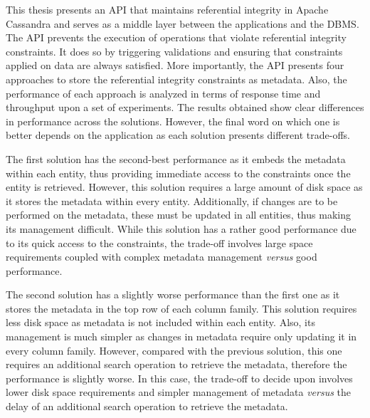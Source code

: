 This thesis presents an \ac{API} that maintains referential integrity in Apache
Cassandra and serves as a middle layer between the applications and the
\ac{DBMS}. The \ac{API} prevents the execution of operations that violate
referential integrity constraints. It does so by triggering validations and
ensuring that constraints applied on data are always satisfied.
More importantly, the \ac{API} presents four approaches to store the referential
integrity constraints as metadata. Also, the performance of each approach is
analyzed in terms of response time and throughput upon a set of experiments. The
results obtained show  clear differences in  performance across the solutions.
However, the final word on which one is better depends on the application as
each solution presents different trade-offs.


The first solution has the second-best performance as it embeds the metadata
within each entity, thus providing immediate access to the constraints once the
entity is retrieved. However, this solution requires a large amount of disk
space as it stores the metadata within every entity. Additionally, if changes
are to be performed on the metadata, these must be updated in all entities, thus
making its management difficult.
While this solution has a rather good performance due to its quick access to the
constraints, the trade-off  involves large space requirements
coupled with complex metadata management \textit{versus} good performance.


The second solution has a slightly worse performance than the first one as it
stores the metadata in the top row of each column family. This solution requires
less disk space as metadata is not included within each entity. Also,
its management is much simpler as changes in metadata  require only updating it
in every column family. However, compared with the previous solution,  this
one requires an additional search operation to retrieve the metadata, therefore  
the performance is slightly worse. In this case, the trade-off to decide upon
involves lower disk space requirements and simpler management  of metadata
\textit{versus} the delay of an additional search operation to retrieve the metadata.





